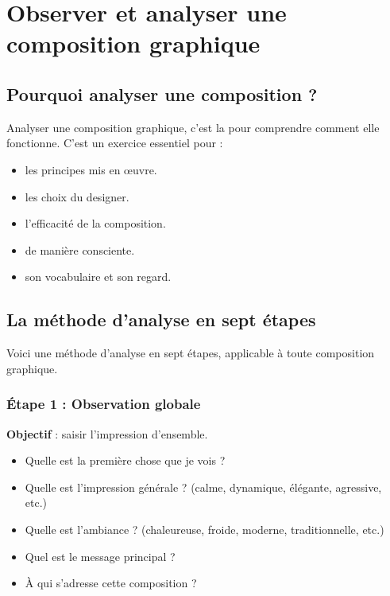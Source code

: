 \section{Observer et analyser une composition graphique}

\subsection{Pourquoi analyser une composition ?}

Analyser une composition graphique, c'est la  pour comprendre comment elle fonctionne. C'est un exercice essentiel pour :

\begin{itemize}
    \item {} les principes mis en œuvre.
    \item {} les choix du designer.
    \item {} l'efficacité de la composition.
    \item {} de manière consciente.
    \item {} son vocabulaire et son regard.
\end{itemize}

\subsection{La méthode d'analyse en sept étapes}

Voici une méthode d'analyse en sept étapes, applicable à toute composition graphique.

\subsubsection{Étape 1 : Observation globale}

\textbf{Objectif} : saisir l'impression d'ensemble.

\begin{itemize}
    \item Quelle est la première chose que je vois ?
    \item Quelle est l'impression générale ? (calme, dynamique, élégante, agressive, etc.)
    \item Quelle est l'ambiance ? (chaleureuse, froide, moderne, traditionnelle, etc.)
    \item Quel est le message principal ?
    \item À qui s'adresse cette composition ?
\end{itemize}

